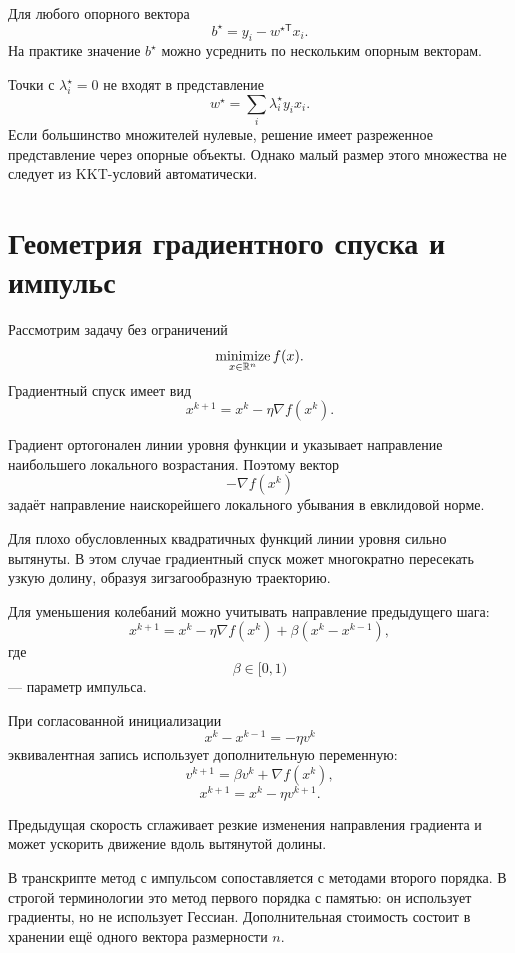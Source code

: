 Для любого опорного вектора
\[
    b^\star
    =
    y_i-w^{\star\mathsf T}x_i.
\]
На практике значение \(b^\star\) можно усреднить по нескольким
опорным векторам.

Точки с \(\lambda_i^\star=0\) не входят в представление
\[
    w^\star
    =
    \sum_i\lambda_i^\star y_i x_i.
\]
Если большинство множителей нулевые, решение имеет разреженное
представление через опорные объекты. Однако малый размер этого
множества не следует из KKT-условий автоматически.

\section{Геометрия градиентного спуска и импульс}

Рассмотрим задачу без ограничений
\[
    \operatorname*{minimize}_{x\in\mathbb{R}^n}f(x).
\]
Градиентный спуск имеет вид
\[
    x^{k+1}
    =
    x^k-\eta\nabla f(x^k).
\]

Градиент ортогонален линии уровня функции и указывает направление
наибольшего локального возрастания. Поэтому вектор
\[
    -\nabla f(x^k)
\]
задаёт направление наискорейшего локального убывания в евклидовой
норме.

Для плохо обусловленных квадратичных функций линии уровня сильно
вытянуты. В этом случае градиентный спуск может многократно пересекать
узкую долину, образуя зигзагообразную траекторию.



Для уменьшения колебаний можно учитывать направление предыдущего
шага:
\[
    x^{k+1}
    =
    x^k
    -
    \eta\nabla f(x^k)
    +
    \beta(x^k-x^{k-1}),
\]
где
\[
    \beta\in[0,1)
\]
--- параметр импульса.

При согласованной инициализации
\[
    x^k-x^{k-1}=-\eta v^k
\]
эквивалентная запись использует дополнительную переменную:
\[
    v^{k+1}
    =
    \beta v^k+\nabla f(x^k),
\]
\[
    x^{k+1}
    =
    x^k-\eta v^{k+1}.
\]

Предыдущая скорость сглаживает резкие изменения направления
градиента и может ускорить движение вдоль вытянутой долины.

\begin{remark}
В транскрипте метод с импульсом сопоставляется с методами второго
порядка. В строгой терминологии это метод первого порядка с памятью:
он использует градиенты, но не использует Гессиан. Дополнительная
стоимость состоит в хранении ещё одного вектора размерности \(n\).
\end{remark}

